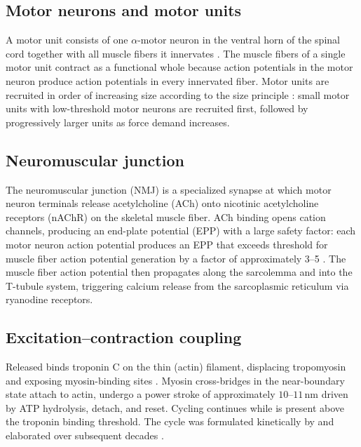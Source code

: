 \documentclass[11pt,twocolumn,a4paper]{article}
\theoremstyle{definition}
\theoremstyle{remark}
\begin{document}
\subsection{Motor neurons and motor units}

A motor unit consists of one $\alpha$-motor neuron in the ventral horn
of the spinal cord together with all muscle fibers it innervates
\citep{sherrington1925}. The muscle fibers of a single motor unit
contract as a functional whole because action potentials in the motor
neuron produce action potentials in every innervated fiber. Motor
units are recruited in order of increasing size according to the size
principle \citep{henneman1957}: small motor units with low-threshold
motor neurons are recruited first, followed by progressively larger
units as force demand increases.

\subsection{Neuromuscular junction}

The neuromuscular junction (NMJ) is a specialized synapse at which
motor neuron terminals release acetylcholine (ACh) onto nicotinic
acetylcholine receptors (nAChR) on the skeletal muscle fiber. ACh
binding opens cation channels, producing an end-plate potential (EPP)
with a large safety factor: each motor neuron action potential
produces an EPP that exceeds threshold for muscle fiber action
potential generation by a factor of approximately 3--5
\citep{katz1967,wood2001}. The muscle fiber action potential then
propagates along the sarcolemma and into the T-tubule system,
triggering calcium release from the sarcoplasmic reticulum via
ryanodine receptors.

\subsection{Excitation--contraction coupling}

Released  binds troponin C on the thin (actin) filament,
displacing tropomyosin and exposing myosin-binding sites
\citep{huxley1971,gordon2000}. Myosin cross-bridges in the
near-boundary state attach to actin, undergo a power stroke of
approximately $10$--$11$\,nm driven by ATP hydrolysis, detach, and
reset. Cycling continues while  is present above the
troponin binding threshold. The cycle was formulated kinetically by
\citet{huxley1957} and elaborated over subsequent decades
\citep{huxley1974,gordon2000,piazzesi2007}.
\end{document}
